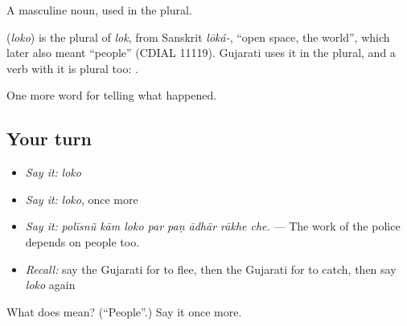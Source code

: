 A masculine noun, used in the plural.

\begin{cousinweb}
\textbf{} (\emph{loko}) is the plural of \emph{lok}, from Sanskrit \emph{lōká-}, \textquotedblleft{}open space, the world\textquotedblright{}, which later also meant \textquotedblleft{}people\textquotedblright{} (CDIAL 11119). Gujarati uses it in the plural, and a verb with it is plural too: \textbf{ }.
\end{cousinweb}

\begin{grammarlens}[title={What you've built}]
One more word for telling what happened.
\end{grammarlens}

\subsection*{Your turn}
\begin{itemize}
\raggedright
  \item \emph{Say it:} \emph{loko}
  \item \emph{Say it:} \emph{loko}, once more
  \item \emph{Say it:} \emph{polīsnũ kām loko par paṇ ādhār rākhe che.} — The work of the police depends on people too.
  \item \emph{Recall:} say the Gujarati for to flee, then the Gujarati for to catch, then say \emph{loko} again
\end{itemize}

\begin{tcolorbox}[breakable,colback=teal!4,colframe=teal!35!black,title={Before you move on}]
What does  mean? (\textquotedblleft{}People\textquotedblright{}.) Say it once more.
\end{tcolorbox}
